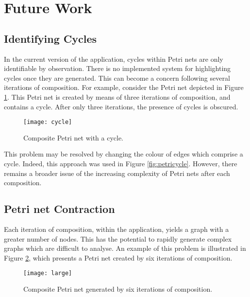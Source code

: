 \documentclass[../Dissertation.tex]{subfiles}
\begin{document}
\section{Future Work}

\subsection{Identifying Cycles}
In the current version of the application, cycles within Petri nets are only identifiable by observation. There is no implemented system for highlighting cycles once they are generated. This can become a concern following several iterations of composition. For example, consider the Petri net depicted in Figure \ref{fig:cycle}. This Petri net is created by means of three iterations of composition, and contains a cycle. After only three iterations, the presence of cycles is obscured.

\begin{figure}[H]
\begin{center}
\texttt{[image: cycle]}
\end{center}
\caption{Composite Petri net with a cycle.}
\label{fig:cycle}
\end{figure}

This problem may be resolved by changing the colour of edges which comprise a cycle. Indeed, this approach was used in Figure \ref{fig:petricycle}. However, there remains a broader issue of the increasing complexity of Petri nets after each composition.

\subsection{Petri net Contraction}
Each iteration of composition, within the application, yields a graph with a greater number of nodes. This has the potential to rapidly generate complex graphs which are difficult to analyse. An example of this problem is illustrated in Figure \ref{fig:large}, which presents a Petri net created by six iterations of composition.

\begin{figure}[H]
\begin{center}
\texttt{[image: large]}
\end{center}
\caption{Composite Petri net generated by six iterations of composition.}
\label{fig:large}
\end{figure}
\end{document}
